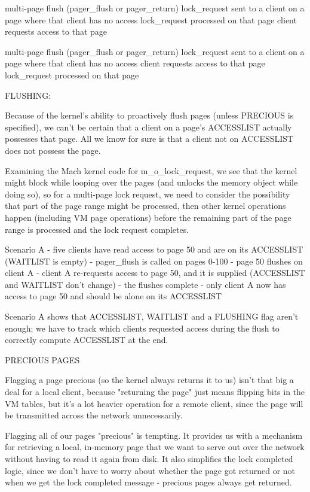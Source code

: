 \documentclass{article}
\begin{document}
multi-page flush (pager_flush or pager_return)
lock_request sent to a client on a page where that client has no access
lock_request processed on that page
client requests access to that page

multi-page flush (pager_flush or pager_return)
lock_request sent to a client on a page where that client has no access
client requests access to that page
lock_request processed on that page



FLUSHING:

Because of the kernel's ability to proactively flush pages (unless PRECIOUS is specified),
we can't be certain that a client on a page's ACCESSLIST actually possesses that page.
All we know for sure is that a client not on ACCESSLIST does not possess the page.

Examining the Mach kernel code for m_o_lock_request, we see that the kernel might block
while looping over the pages (and unlocks the memory object while doing so), so for a
multi-page lock request, we need to consider the possibility that part of the page range
might be processed, then other kernel operations happen (including VM page operations)
before the remaining part of the page range is processed and the lock request completes.


Scenario A
- five clients have read access to page 50 and are on its ACCESSLIST (WAITLIST is empty)
- pager_flush is called on pages 0-100
- page 50 flushes on client A
- client A re-requests access to page 50, and it is supplied (ACCESSLIST and WAITLIST don't change)
- the flushes complete
- only client A now has access to page 50 and should be alone on its ACCESSLIST

Scenario A shows that ACCESSLIST, WAITLIST and a FLUSHING flag aren't enough; we have to track
which clients requested access during the flush to correctly compute ACCESSLIST at the end.


PRECIOUS PAGES

Flagging a page precious (so the kernel always returns it to us) isn't that big a deal
for a local client, because "returning the page" just means flipping bits in the VM tables,
but it's a lot heavier operation for a remote client, since the page will be transmitted
across the network unnecessarily.

Flagging all of our pages "precious" is tempting.  It provides us with a mechanism
for retrieving a local, in-memory page that we want to serve out over the network
without having to read it again from disk.  It also simplifies the lock completed
logic, since we don't have to worry about whether the page got returned or not
when we get the lock completed message - precious pages always get returned.
\end{document}

